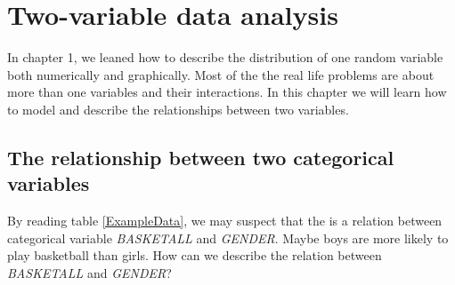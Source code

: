 \documentclass[a4paper, 12pt,twoside]{book}
\begin{document}
\pagestyle{fancy}
\fancyhf{}
\renewcommand{\chaptermark}[1]{ \markboth{#1}{} }
\fancyhead[CE,CO]{\leftmark}
\fancyfoot[LE,RO]{\thepage}

\chapter{Two-variable data analysis}
\thispagestyle{empty}
In chapter 1, we leaned how to describe the distribution of one random variable both numerically and graphically. Most of the the real life problems are about more than one variables and their interactions. In this chapter we will learn how to model and describe the relationships between two variables.
\newpage

\section{\large{The relationship between two categorical variables}}
\vspace{0.6cm}

By reading table \ref{ExampleData}, we may suspect that the is a relation between categorical variable \textit{BASKETALL} and \textit{GENDER}. Maybe boys are more likely to play basketball than girls. How can we describe the relation between  \textit{BASKETALL} and \textit{GENDER}?\vspace{0.3cm}\\
\end{document}
